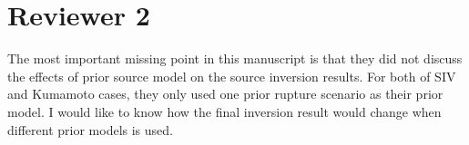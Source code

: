\documentclass[10pt]{extarticle}
\begin{document}


%
\section*{Reviewer 2}
%
%
\begin{ReviewerComment}{2}
\noindent
 The most important missing point in this manuscript is 
 that they did not discuss the effects of prior source 
 model on the source inversion results. For both of SIV 
 and Kumamoto cases, they only used one prior rupture 
 scenario as their prior model. I would like to know 
 how the final inversion result would change when different 
 prior models is used.
\end{ReviewerComment}
\end{document}
